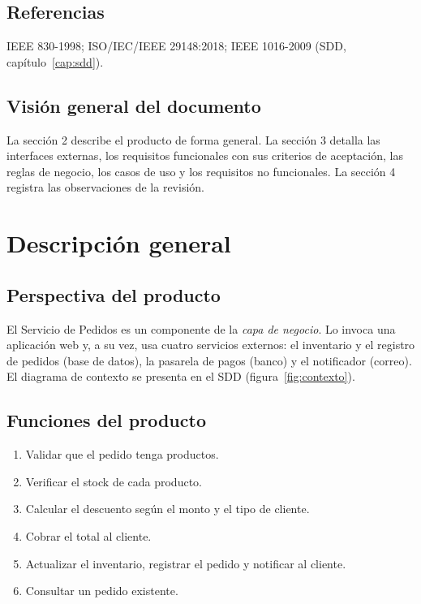 \documentclass[11pt,a4paper,oneside]{report}
\begin{document}
\subsection{Referencias}
IEEE 830-1998; ISO/IEC/IEEE 29148:2018; IEEE 1016-2009 (SDD, capítulo~\ref{cap:sdd}).

\subsection{Visión general del documento}
La sección 2 describe el producto de forma general. La sección 3 detalla las interfaces externas, los requisitos funcionales con sus criterios de aceptación, las reglas de negocio, los casos de uso y los requisitos no funcionales. La sección 4 registra las observaciones de la revisión.

\section{Descripción general}
\subsection{Perspectiva del producto}
El Servicio de Pedidos es un componente de la \emph{capa de negocio}. Lo invoca una aplicación web y, a su vez, usa cuatro servicios externos: el inventario y el registro de pedidos (base de datos), la pasarela de pagos (banco) y el notificador (correo). El diagrama de contexto se presenta en el SDD (figura~\ref{fig:contexto}).

\subsection{Funciones del producto}
\begin{enumerate}[label=F\arabic*.]
  \item Validar que el pedido tenga productos.
  \item Verificar el stock de cada producto.
  \item Calcular el descuento según el monto y el tipo de cliente.
  \item Cobrar el total al cliente.
  \item Actualizar el inventario, registrar el pedido y notificar al cliente.
  \item Consultar un pedido existente.
\end{enumerate}
\end{document}

